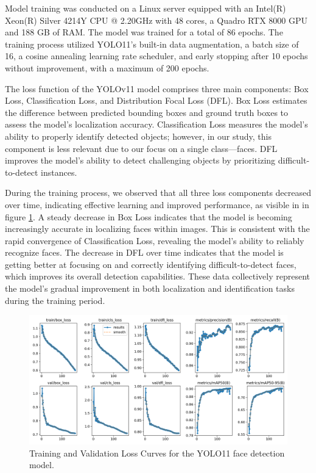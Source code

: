 \documentclass[
  man,floatsintext]{apa6}
\begin{document}
Model training was conducted on a Linux server equipped with an Intel(R) Xeon(R) Silver 4214Y CPU @ 2.20GHz with 48 cores, a Quadro RTX 8000 GPU and 188 GB of RAM. The model was trained for a total of 86 epochs. The training process utilized YOLO11's built-in data augmentation, a batch size of 16, a cosine annealing learning rate scheduler, and early stopping after 10 epochs without improvement, with a maximum of 200 epochs.

The loss function of the YOLOv11 model comprises three main components: Box Loss, Classification Loss, and Distribution Focal Loss (DFL). Box Loss estimates the difference between predicted bounding boxes and ground truth boxes to assess the model's localization accuracy. Classification Loss measures the model's ability to properly identify detected objects; however, in our study, this component is less relevant due to our focus on a single class---faces. DFL improves the model's ability to detect challenging objects by prioritizing difficult-to-detect instances.

During the training process, we observed that all three loss components decreased over time, indicating effective learning and improved performance, as visible in in figure \ref{fig:face-loss-curves}. A steady decrease in Box Loss indicates that the model is becoming increasingly accurate in localizing faces within images. This is consistent with the rapid convergence of Classification Loss, revealing the model's ability to reliably recognize faces. The decrease in DFL over time indicates that the model is getting better at focusing on and correctly identifying difficult-to-detect faces, which improves its overall detection capabilities. These data collectively represent the model's gradual improvement in both localization and identification tasks during the training period.

\begin{figure}

{\centering \includegraphics[width=450px]{images/yolo_face_loss_curves} 

}

\caption{Training and Validation Loss Curves for the YOLO11 face detection model.}\label{fig:face-loss-curves}
\end{figure}
\end{document}

